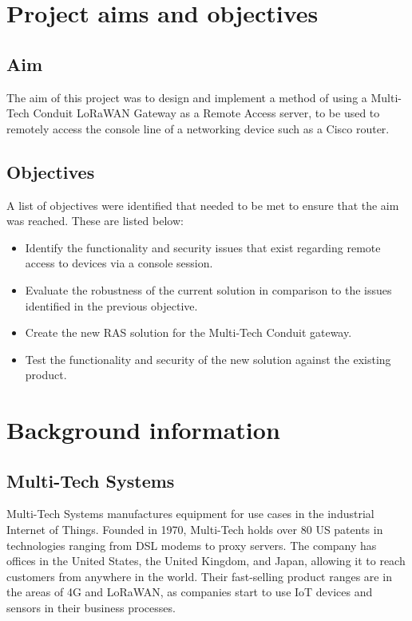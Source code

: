 \section{Project aims and objectives}
\label{section:intro-aims}
\subsection{Aim}
The aim of this project was to design and implement a method of using a Multi-Tech Conduit LoRaWAN Gateway as a Remote Access server, to be used to remotely access the console line of a networking device such as a Cisco router.
\subsection{Objectives}
A list of objectives were identified that needed to be met to ensure that the aim was reached. These are listed below:
\begin{itemize}
    \item Identify the functionality and security issues that exist regarding remote access to devices via a console session.
    \item Evaluate the robustness of the current solution in comparison to the issues identified in the previous objective.
    \item Create the new RAS solution for the Multi-Tech Conduit gateway.
    \item Test the functionality and security of the new solution against the existing product.
\end{itemize}

\section{Background information}
\label{section:intro-background}
\subsection{Multi-Tech Systems}
Multi-Tech Systems manufactures equipment for use cases in the industrial Internet of Things. Founded in 1970, Multi-Tech holds over 80 US patents in technologies ranging from DSL modems to proxy servers. The company has offices in the United States, the United Kingdom, and Japan, allowing it to reach customers from anywhere in the world. Their fast-selling product ranges are in the areas of 4G and LoRaWAN, as companies start to use IoT devices and sensors in their business processes.